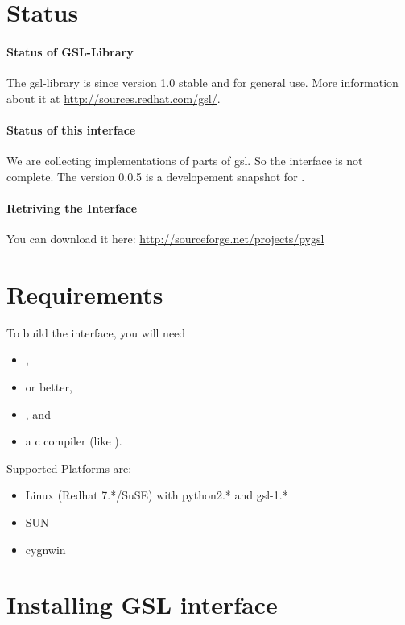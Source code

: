 \section{Status}

\paragraph*{Status of GSL-Library}
The gsl-library is since version 1.0 stable and for general use.
More information about it at \url{http://sources.redhat.com/gsl/}.

\paragraph*{Status of this interface}
We are collecting implementations of parts of gsl.
So the interface is not complete.
The version 0.0.5 is a developement snapshot for .

\paragraph*{Retriving the Interface}
You can download it here: \url{http://sourceforge.net/projects/pygsl}

\section{Requirements}

To build the interface, you will need
\begin{itemize}
\item {},
\item {} or better,
\item {}, and
\item a c compiler (like ).
\end{itemize}

Supported Platforms are:
\begin{itemize}
\item Linux (Redhat 7.*/SuSE) with python2.* and gsl-1.*
\item SUN
\item cygnwin
\end{itemize}

\section{Installing GSL interface}

